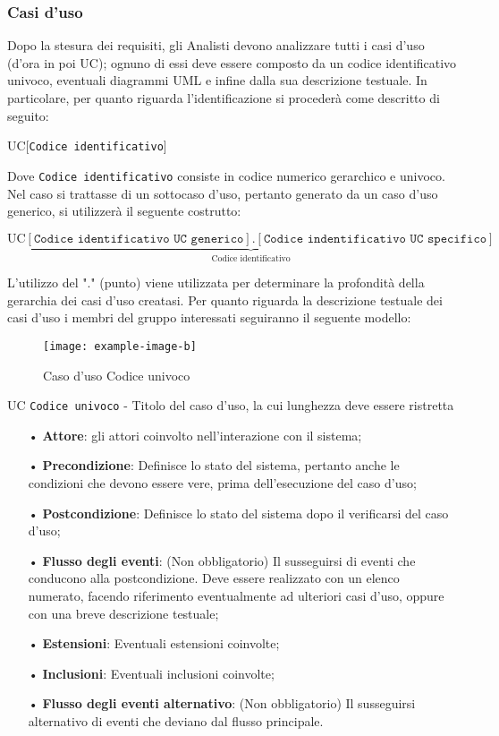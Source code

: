 \subsubsection{Casi d'uso}
Dopo la stesura dei requisiti, gli Analisti devono analizzare tutti i casi d'uso (d'ora in poi UC); ognuno di essi deve essere composto da un codice identificativo univoco, eventuali diagrammi UML e infine dalla sua descrizione testuale. In particolare, per quanto riguarda l'identificazione si procederà come descritto di seguito:
\begin{center}
UC[\texttt{Codice identificativo}]
\end{center}
Dove \texttt{Codice identificativo} consiste in codice numerico {gerarchico} e univoco.
Nel caso si trattasse di un {sottocaso d'uso}, pertanto generato da un caso d'uso generico, si utilizzerà il seguente costrutto:
\begin{center}
$\text{UC}\underbrace{[\texttt{Codice identificativo UC generico}].[\texttt{Codice indentificativo UC specifico}]}_{\text{Codice   identificativo}}$
\end{center}
L'utilizzo del "." (punto) viene utilizzata per determinare la profondità della gerarchia dei casi d'uso creatasi.
Per quanto riguarda la descrizione testuale dei casi d'uso i membri del gruppo interessati seguiranno il seguente modello:
\begin{figure}[H]
\centering
\texttt{[image: example-image-b]}
\caption{Caso d'uso Codice univoco}
\end{figure}
UC \texttt{Codice univoco} - Titolo del caso d'uso, la cui lunghezza deve essere ristretta
\begin{itemize}
\item[•] \textbf{Attore}: gli attori coinvolto nell'interazione con il sistema;
\item[•] \textbf{Precondizione}: Definisce lo stato del sistema, pertanto anche le condizioni che devono essere vere, prima dell'esecuzione del caso d'uso;
\item[•] \textbf{Postcondizione}: Definisce lo stato del sistema dopo il verificarsi del caso d'uso; 
\item[•] \textbf{Flusso degli eventi}: (Non obbligatorio) Il susseguirsi di eventi che conducono alla postcondizione. Deve essere realizzato con un elenco numerato, facendo riferimento eventualmente ad ulteriori casi d'uso, oppure con una breve descrizione testuale;
\item[•] \textbf{Estensioni}: Eventuali estensioni coinvolte;
\item[•] \textbf{Inclusioni}: Eventuali inclusioni coinvolte;
\item[•] \textbf{Flusso degli eventi alternativo}: (Non obbligatorio) Il susseguirsi alternativo di eventi che deviano dal flusso principale. 
\end{itemize}



